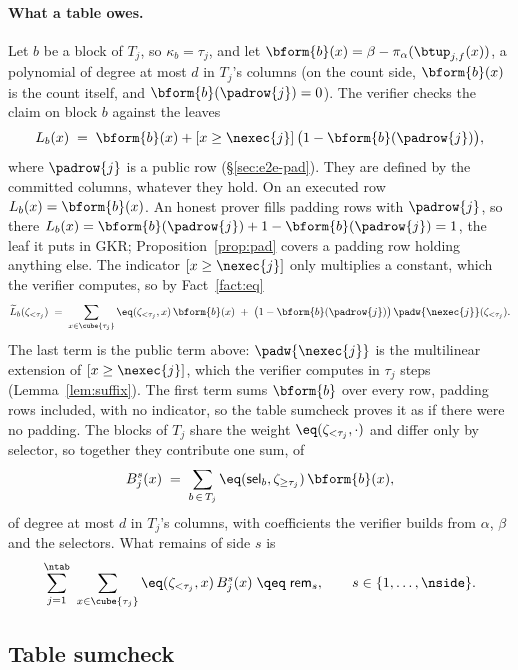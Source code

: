 \paragraph{What a table owes.} Let $b$ be a block of $T_j$, so $\kappa_b=\tau_j$, and let $\bform{b}(x)=\beta-\pi_\alpha(\btup_{j,f}(x))$, a polynomial of degree at most $d$ in $T_j$'s columns (on the count side, $\bform{b}(x)$ is the count itself, and $\bform{b}(\padrow{j})=0$). The verifier checks the claim on block $b$ against the leaves
\[
  L_b(x)\;=\;\bform{b}(x)+[x\ge\nexec{j}]\,\bigl(1-\bform{b}(\padrow{j})\bigr),
\]
where $\padrow{j}$ is a public row (\S\ref{sec:e2e-pad}). They are defined by the committed columns, whatever they hold. On an executed row $L_b(x)=\bform{b}(x)$. An honest prover fills padding rows with $\padrow{j}$, so there $L_b(x)=\bform{b}(\padrow{j})+1-\bform{b}(\padrow{j})=1$, the leaf it puts in GKR; Proposition~\ref{prop:pad} covers a padding row holding anything else. The indicator $[x\ge\nexec{j}]$ only multiplies a constant, which the verifier computes, so by Fact~\ref{fact:eq}
\begin{equation}\label{eq:pad_leaf}
  \widetilde L_b(\zeta_{<\tau_j})\;=\;\sum_{x\in\cube{\tau_j}}\eq(\zeta_{<\tau_j},x)\,\bform{b}(x)\;+\;\bigl(1-\bform{b}(\padrow{j})\bigr)\,\padw{\nexec{j}}(\zeta_{<\tau_j}).
\end{equation}
The last term is the public term above: $\padw{\nexec{j}}$ is the multilinear extension of $[x\ge\nexec{j}]$, which the verifier computes in $\tau_j$ steps (Lemma~\ref{lem:suffix}). The first term sums $\bform{b}$ over every row, padding rows included, with no indicator, so the table sumcheck proves it as if there were no padding. The blocks of $T_j$ share the weight $\eq(\zeta_{<\tau_j},\cdot)$ and differ only by selector, so together they contribute one sum, of
\begin{equation}\label{eq:bus_poly}
  B^{s}_j(x)\;=\;\sum_{b\,\in\,T_j}\eq(\mathsf{sel}_b,\zeta_{\ge\tau_j})\,\bform{b}(x),
\end{equation}
of degree at most $d$ in $T_j$'s columns, with coefficients the verifier builds from $\alpha$, $\beta$ and the selectors. What remains of side $s$ is
\begin{equation}\label{eq:bus}
  \sum_{j=1}^{\ntab}\ \sum_{x\in\cube{\tau_j}}\eq(\zeta_{<\tau_j},x)\,B^{s}_j(x)\;\qeq\;\mathsf{rem}_{s},
  \qquad s\in\{1,\dots,\nside\}.
\end{equation}

\subsection{Table sumcheck}\label{sec:air}

